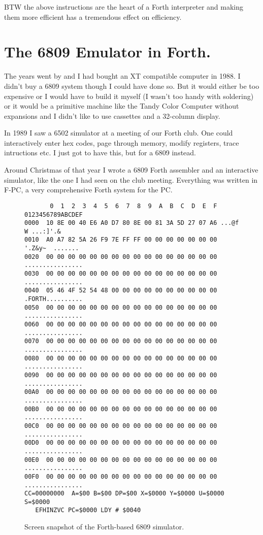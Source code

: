 BTW the above instructions are the heart of a Forth interpreter and making
them more efficient has a tremendous effect on efficiency.

\section{The 6809 Emulator in Forth.}

The years went by and I had bought an XT compatible computer in 1988. I
didn't buy a 6809 system though I could have done so. But it would either be
too expensive or I would have to build it myself (I wasn't too handy with
soldering) or it would be a primitive machine like the Tandy Color Computer
without expansions and I didn't like to use cassettes and a 32-column
display.

In 1989 I saw a 6502 simulator at a meeting of our Forth club. One could
interactively enter hex codes, page through memory, modify registers, trace
intructions etc. I just got to have this, but for a 6809 instead.

Around Christmas of that year I wrote a 6809 Forth assembler and an
interactive simulator, like the one I had seen on the club meeting.
Everything was written in F-PC, a very comprehensive Forth system for the
PC. 

\begin{figure}
\begin{verbatim}
       0  1  2  3  4  5  6  7  8  9  A  B  C  D  E  F 0123456789ABCDEF
0000  10 8E 00 40 E6 A0 D7 80 8E 00 81 3A 5D 27 07 A6 ...@f W ...:]'.&
0010  A0 A7 82 5A 26 F9 7E FF FF 00 00 00 00 00 00 00  '.Z&y~  .......
0020  00 00 00 00 00 00 00 00 00 00 00 00 00 00 00 00 ................
0030  00 00 00 00 00 00 00 00 00 00 00 00 00 00 00 00 ................
0040  05 46 4F 52 54 48 00 00 00 00 00 00 00 00 00 00 .FORTH..........
0050  00 00 00 00 00 00 00 00 00 00 00 00 00 00 00 00 ................
0060  00 00 00 00 00 00 00 00 00 00 00 00 00 00 00 00 ................
0070  00 00 00 00 00 00 00 00 00 00 00 00 00 00 00 00 ................
0080  00 00 00 00 00 00 00 00 00 00 00 00 00 00 00 00 ................
0090  00 00 00 00 00 00 00 00 00 00 00 00 00 00 00 00 ................
00A0  00 00 00 00 00 00 00 00 00 00 00 00 00 00 00 00 ................
00B0  00 00 00 00 00 00 00 00 00 00 00 00 00 00 00 00 ................
00C0  00 00 00 00 00 00 00 00 00 00 00 00 00 00 00 00 ................
00D0  00 00 00 00 00 00 00 00 00 00 00 00 00 00 00 00 ................
00E0  00 00 00 00 00 00 00 00 00 00 00 00 00 00 00 00 ................
00F0  00 00 00 00 00 00 00 00 00 00 00 00 00 00 00 00 ................
CC=00000000  A=$00 B=$00 DP=$00 X=$0000 Y=$0000 U=$0000 S=$0000 
   EFHINZVC PC=$0000 LDY # $0040                                 
\end{verbatim}
\caption{Screen snapshot of the Forth-based 6809 simulator.}
\end{figure}

